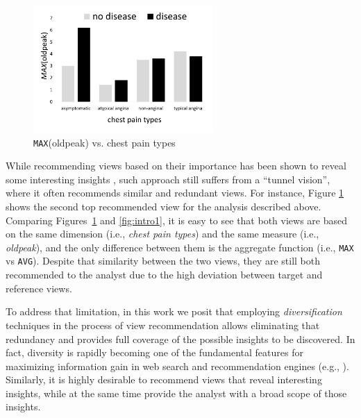 \begin{figure}
	\includegraphics[width=2.7in]{figures/introduction/cp_max_oldpeak}
		\vspace{-8pt}

	\caption{ {\tt MAX}(oldpeak) vs. chest pain types}
	\label{fig:intro3}
	\vspace{-8pt}

\end{figure}


While recommending views based on their importance has been shown to reveal some interesting insights \cite{Vartak2015, Vartak2014, Ehsan2016}, such approach still suffers from  a ``tunnel vision'', where it often recommends similar and redundant views. 
%
For instance, Figure \ref{fig:intro3} shows the second top recommended view for the analysis described above. 
%
Comparing Figures~\ref{fig:intro3} and \ref{fig:intro1}, it is easy to see that both views are based on the same dimension (i.e., {\it chest pain types}) and the same measure (i.e., {\it oldpeak}), and the only difference between them is the aggregate function (i.e., {\tt MAX} vs {\tt AVG}). 
%
Despite that similarity between the two views, they are still both recommended to the analyst due to the high deviation between target and reference views.



To address that limitation, in this work we posit that employing {\em diversification} techniques in the process of view recommendation allows eliminating that redundancy and provides full coverage of the possible insights to be discovered. 
%
In fact, diversity is rapidly becoming one of the fundamental features for maximizing information gain in web search and recommendation engines (e.g., \cite{Zhang2008,Clarke2008,Rafiei2010, Yu2009}). 
%
Similarly, it is highly desirable to recommend views that reveal interesting insights, while at the same time provide the analyst with a broad scope of those insights.

